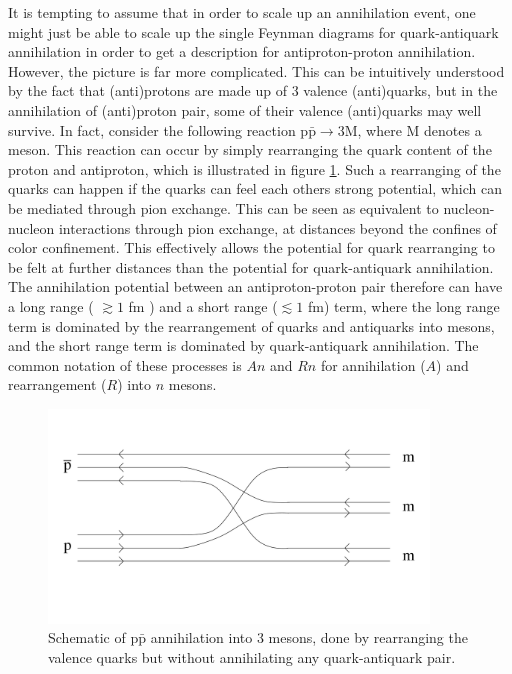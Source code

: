 It is tempting to assume that in order to scale up an annihilation event, one might just be able to scale up the single Feynman diagrams for quark-antiquark annihilation in order to get a description for antiproton-proton annihilation. However, the picture is far more complicated. This can be intuitively understood by the fact that (anti)protons are made up of 3 valence (anti)quarks, but in the annihilation of (anti)proton pair, some of their valence (anti)quarks may well survive. In fact, consider the following reaction $\mathrm{p\bar{p}} \rightarrow 3 \mathrm{M}$, where M denotes a meson. This reaction can occur by simply rearranging the quark content of the proton and antiproton, which is illustrated in figure \ref{fig:Quark_Rearrangement}. Such a rearranging of the quarks can happen if the quarks can feel each others strong potential, which can be mediated through pion exchange. This can be seen as equivalent to nucleon-nucleon interactions through pion exchange, at distances beyond the confines of color confinement. This effectively allows the potential for quark rearranging to be felt at further distances than the potential for quark-antiquark annihilation. The annihilation potential between an antiproton-proton pair therefore can have a long range ( $\gtrsim 1$ fm ) and a short range ($\lesssim 1$ fm) term, where the long range term is dominated by the rearrangement of quarks and antiquarks into mesons, and the short range term is dominated by quark-antiquark annihilation. The common notation of these processes is $An$ and $Rn$ for annihilation ($A$) and rearrangement ($R$) into $n$ mesons.\\

\begin{figure}[h!]
    \centering
    \includegraphics[width=0.9\textwidth]{figures/quark_rearrangment.pdf}
    \caption{Schematic of $\mathrm{p\bar{p}}$ annihilation into 3 mesons, done by rearranging the valence quarks but without annihilating any quark-antiquark pair.}
    \label{fig:Quark_Rearrangement}
\end{figure}

